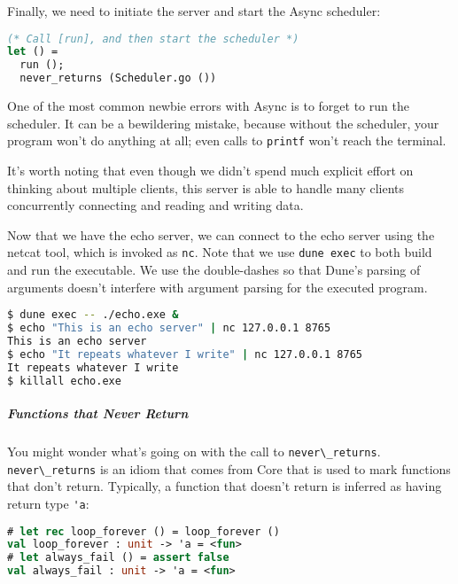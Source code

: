 Finally, we need to initiate the server and start the Async scheduler:

\begin{lstlisting}[language=Caml]
(* Call [run], and then start the scheduler *)
let () =
  run ();
  never_returns (Scheduler.go ())
\end{lstlisting}

One of the most common newbie errors with Async is to forget to run the
scheduler. It can be a bewildering mistake, because without the
scheduler, your program won't do anything at all; even calls to
\passthrough{\lstinline!printf!} won't reach the terminal.

It's worth noting that even though we didn't spend much explicit effort
on thinking about multiple clients, this server is able to handle many
clients concurrently connecting and reading and writing data.

Now that we have the echo server, we can connect to the echo server
using the netcat tool, which is invoked as \passthrough{\lstinline!nc!}.
Note that we use \passthrough{\lstinline!dune exec!} to both build and
run the executable. We use the double-dashes so that Dune's parsing of
arguments doesn't interfere with argument parsing for the executed
program.

\begin{lstlisting}[language=bash]
$ dune exec -- ./echo.exe &
$ echo "This is an echo server" | nc 127.0.0.1 8765
This is an echo server
$ echo "It repeats whatever I write" | nc 127.0.0.1 8765
It repeats whatever I write
$ killall echo.exe
\end{lstlisting}

\hypertarget{functions-that-never-return}{%
\subparagraph{Functions that Never
Return}\label{functions-that-never-return}}

You might wonder what's going on with the call to
\passthrough{\lstinline!never\_returns!}.
\passthrough{\lstinline!never\_returns!} is an idiom that comes from
Core that is used to mark functions that don't return. Typically, a
function that doesn't return is inferred as having return type
\passthrough{\lstinline!'a!}:

\begin{lstlisting}[language=Caml]
# let rec loop_forever () = loop_forever ()
val loop_forever : unit -> 'a = <fun>
# let always_fail () = assert false
val always_fail : unit -> 'a = <fun>
\end{lstlisting}

